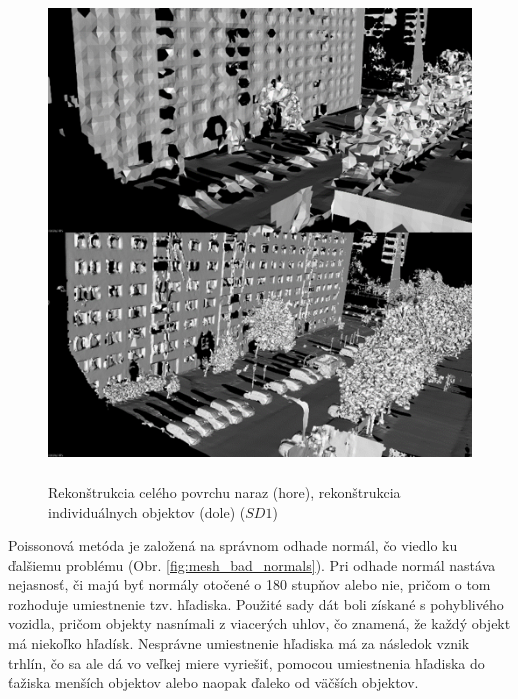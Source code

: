 \begin{figure}[!htbp]
  \centering
  \includegraphics[width=16cm, height=13cm]{img/mesh_no_segmentation.png}
  \caption{Rekonštrukcia celého povrchu naraz (hore), rekonštrukcia individuálnych objektov (dole) ($SD1$)} 
  \label{fig:mesh_no_segmentation}
\end{figure} 

\indent Poissonová metóda je založená na správnom odhade normál, čo viedlo ku ďalšiemu problému (Obr. \ref{fig:mesh_bad_normals}). Pri odhade normál nastáva nejasnosť, či majú byť normály otočené o 180 stupňov alebo nie, pričom o tom rozhoduje umiestnenie tzv. hľadiska. Použité sady dát boli získané s pohyblivého vozidla, pričom objekty nasnímali z viacerých uhlov, čo znamená, že každý objekt má niekoľko hľadísk. Nesprávne umiestnenie hľadiska má za následok vznik trhlín, čo sa ale dá vo veľkej miere vyriešiť, pomocou umiestnenia hľadiska do ťažiska menších objektov alebo naopak ďaleko od väčších objektov.


